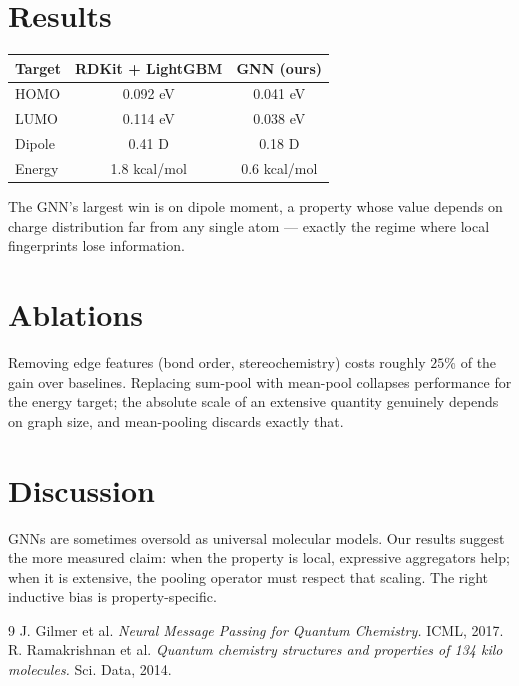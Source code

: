 \documentclass[11pt]{article}
\begin{document}
\section{Results}
\begin{tabular}{lcc}
\hline
Target & RDKit + LightGBM & GNN (ours) \\
\hline
HOMO   & 0.092 eV  & 0.041 eV \\
LUMO   & 0.114 eV  & 0.038 eV \\
Dipole & 0.41 D    & 0.18 D \\
Energy & 1.8 kcal/mol & 0.6 kcal/mol \\
\hline
\end{tabular}

The GNN's largest win is on dipole moment, a property whose value depends on
charge distribution far from any single atom --- exactly the regime where
local fingerprints lose information.

\section{Ablations}
Removing edge features (bond order, stereochemistry) costs roughly $25\%$ of
the gain over baselines. Replacing sum-pool with mean-pool collapses
performance for the energy target; the absolute scale of an extensive quantity
genuinely depends on graph size, and mean-pooling discards exactly that.

\section{Discussion}
GNNs are sometimes oversold as universal molecular models. Our results suggest
the more measured claim: when the property is local, expressive aggregators
help; when it is extensive, the pooling operator must respect that scaling.
The right inductive bias is property-specific.


\begin{thebibliography}{9}
 J. Gilmer et al. \emph{Neural Message Passing for Quantum Chemistry.} ICML, 2017.
 R. Ramakrishnan et al. \emph{Quantum chemistry structures and properties of 134 kilo molecules.} Sci. Data, 2014.
\end{thebibliography}
\end{document}

